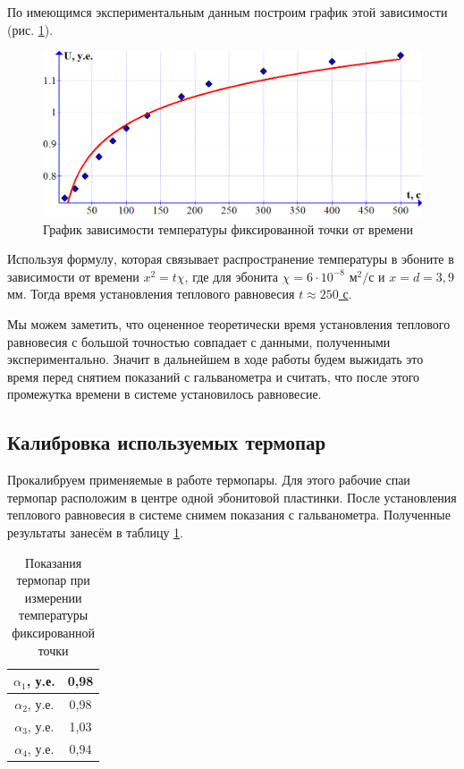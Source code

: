 \documentclass[a4paper,12pt]{article} %
\begin{document}
По имеющимся экспериментальным данным построим график этой зависимости (рис. \ref{img:gr1}). 

\begin{figure}[H]
	\begin{center}
		\includegraphics[width=17cm]{gr1.png}
		\caption{График зависимости температуры фиксированной точки от времени}\label{img:gr1}
	\end{center}
\end{figure}

Используя формулу, которая связывает распространение температуры в эбоните в зависимости от времени $ x^2 = t \chi $, где для эбонита $ \chi = 6 \cdot 10^{-8} $ $ \text{м}^2/\text{с} $ и $ x = d = 3,9 $ мм. Тогда время установления теплового равновесия \underline{$ t \approx  250$ с}.

Мы можем заметить, что оцененное теоретически время установления теплового равновесия с большой точностью совпадает с данными, полученными экспериментально. Значит в дальнейшем в ходе работы будем выжидать это время перед снятием показаний с гальванометра и считать, что после этого промежутка времени в системе установилось равновесие.

\subsection{Калибровка используемых термопар}

Прокалибруем применяемые в работе термопары. Для этого рабочие спаи термопар расположим в центре одной эбонитовой пластинки. После установления теплового равновесия в системе снимем показания с гальванометра. Полученные результаты занесём в таблицу \ref{tab:callib}.

\begin{table}[H]
	\centering
	\begin{tabular}{|c|c|}
		\hline
		$ \alpha_1 $, у.е. & 0,98 \\ \hline
		$ \alpha_2 $, у.е. & 0,98 \\ \hline
		$ \alpha_3 $, у.е. & 1,03 \\ \hline
		$ \alpha_4 $, у.е. & 0,94 \\ \hline
	\end{tabular}
	\caption{Показания термопар при измерении температуры фиксированной точки}
	\label{tab:callib}
\end{table}
\end{document}
